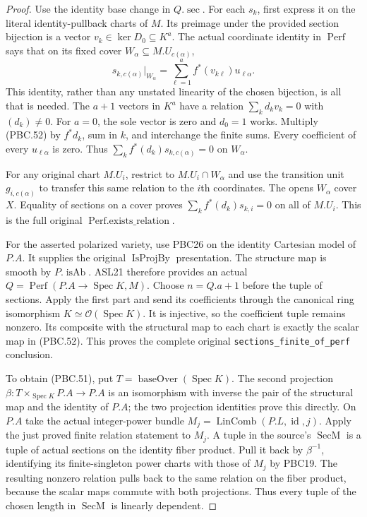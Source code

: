 \documentclass[11pt,a4paper]{article}
\numberwithin{equation}{section}
\theoremstyle{remark}\newtheorem{remark}[theorem]{Remark}
\begin{document}
\begin{proof}
Use the identity base change in $Q.\operatorname{sec}$.
For each $s_k$, first express it on the literal identity-pullback
charts of $M$.  Its preimage under the provided section
bijection is a vector $v_k\in\ker D_0\subseteq K^a$.
The actual coordinate identity in $\operatorname{Perf}$ says
that on its fixed cover $W_\alpha\subseteq M.U_{c(\alpha)}$,
\[
 s_{k,c(\alpha)}|_{W_\alpha}
    =\sum_{\ell=1}^{a} f^*(v_{k\ell})u_{\ell\alpha}.
                                                        \tag{PBC.52}
\]
This identity, rather than any unstated linearity of the
chosen bijection, is all that is needed.
The $a+1$ vectors in $K^a$ have a relation
$\sum_k d_kv_k=0$ with $(d_k)\ne0$.
For $a=0$, the sole vector is zero and $d_0=1$ works.
Multiply (PBC.52) by $f^*d_k$, sum in $k$, and interchange
the finite sums.  Every coefficient of every
$u_{\ell\alpha}$ is zero.  Thus
$\sum_k f^*(d_k)s_{k,c(\alpha)}=0$ on $W_\alpha$.

For any original chart $M.U_i$, restrict to
$M.U_i\cap W_\alpha$ and use the transition unit
$g_{i,c(\alpha)}$ to transfer this same relation to the
$i$th coordinates.  The opens $W_\alpha$ cover $X$.
Equality of sections on a cover proves
$\sum_k f^*(d_k)s_{k,i}=0$ on all of $M.U_i$.
This is the full original $\operatorname{Perf.exists\_\allowbreak relation}$.

For the asserted polarized variety, use PBC26 on the
identity Cartesian model of $P.A$.  It supplies the
original $\operatorname{IsProjBy}$ presentation.
The structure map is smooth by $P.\operatorname{isAb}$.
ASL21 therefore provides an actual
$Q=\operatorname{Perf}(P.A\to\operatorname{Spec}K,M)$.
Choose $n=Q.a+1$ before the tuple of sections.
Apply the first part and send its coefficients through the
canonical ring isomorphism
$K\simeq\mathcal O(\operatorname{Spec}K)$.
It is injective, so the coefficient tuple remains nonzero.
Its composite with the structural map to each chart is
exactly the scalar map in (PBC.52).
This proves the complete original
\texttt{sections\_\allowbreak finite\_\allowbreak of\_\allowbreak perf} conclusion.

To obtain (PBC.51), put $T=\operatorname{baseOver}(\operatorname{Spec}K)$.
The second projection
$\beta:T\times_{\operatorname{Spec}K}P.A\to P.A$
is an isomorphism with inverse the pair of the structural
map and the identity of $P.A$; the two projection identities
prove this directly.
On $P.A$ take the actual integer-power bundle
$M_j=\operatorname{LinComb}(P.L,\operatorname{id},j)$.
Apply the just proved finite relation statement to $M_j$.
A tuple in the source's $\operatorname{SecM}$ is a tuple
of actual sections on the identity fiber product.
Pull it back by $\beta^{-1}$, identifying its finite-singleton
power charts with those of $M_j$ by PBC19.
The resulting nonzero relation pulls back to the same
relation on the fiber product, because the scalar maps
commute with both projections.  Thus every tuple of the
chosen length in $\operatorname{SecM}$ is linearly dependent.


\end{proof}
\end{document}
